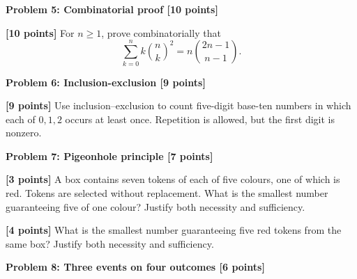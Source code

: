 \documentclass[12pt,letterpaper]{article}
\newcommand{\problemheading}[2][5\baselineskip]{\Needspace{#1}\par\noindent\hspace*{-0.625in}\textbf{#2}\par\nobreak\vspace{0.3em}}
\newcommand{\examspace}[1]{\par\vspace*{#1cm}}
\begin{document}
\vspace*{0.21in}
\problemheading{Problem 5: Combinatorial proof [10 points]}
\begin{list}{}{\setlength{\leftmargin}{0.25in}\setlength{\rightmargin}{0.25in}}\item[]
\begin{description}[font=\normalfont,leftmargin=1.2em,labelsep=0.4em]
\item[] \textbf{[10 points]} For $n\ge1$, prove combinatorially that\[\sum_{k=0}^{n}k\binom nk^2=n\binom{2n-1}{n-1}.\]
\examspace{7}
\end{description}
\end{list}
\clearpage
\vspace*{0.21in}
\problemheading{Problem 6: Inclusion-exclusion [9 points]}
\begin{list}{}{\setlength{\leftmargin}{0.25in}\setlength{\rightmargin}{0.25in}}\item[]
\begin{description}[font=\normalfont,leftmargin=1.2em,labelsep=0.4em]
\item[] \textbf{[9 points]} Use inclusion--exclusion to count five-digit base-ten numbers in which each of $0,1,2$ occurs at least once. Repetition is allowed, but the first digit is nonzero.
\examspace{7}
\end{description}
\end{list}
\clearpage
\vspace*{0.21in}
\problemheading{Problem 7: Pigeonhole principle [7 points]}
\begin{list}{}{\setlength{\leftmargin}{0.25in}\setlength{\rightmargin}{0.25in}}\item[]
\begin{description}[font=\normalfont,leftmargin=1.2em,labelsep=0.4em]
\item[(a)] \textbf{[3 points]} A box contains seven tokens of each of five colours, one of which is red. Tokens are selected without replacement. What is the smallest number guaranteeing five of one colour? Justify both necessity and sufficiency.
\examspace{3}
\Needspace{\dimexpr 4cm+4\baselineskip\relax}
\item[(b)] \textbf{[4 points]} What is the smallest number guaranteeing five red tokens from the same box? Justify both necessity and sufficiency.
\examspace{4}
\end{description}
\end{list}
\clearpage
\vspace*{0.21in}
\problemheading{Problem 8: Three events on four outcomes [6 points]}
\end{document}
